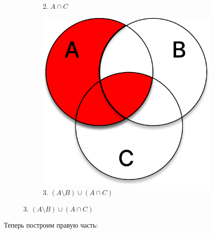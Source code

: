 \documentclass[11pt]{article}
\begin{document}
\begin{figure}[h]
\begin{subfigure}{.32\textwidth}
		\caption{2. $A\cap C$}
	\end{subfigure}
	\begin{subfigure}{.33\textwidth}
		\centering
		\includegraphics[width=1\linewidth]{t3_1_3.pdf}
		\caption{3. $(A \setminus B) \cup (A \cap C)$}
	\end{subfigure}
\end{figure}

Теперь построим правую часть:
\end{document}
